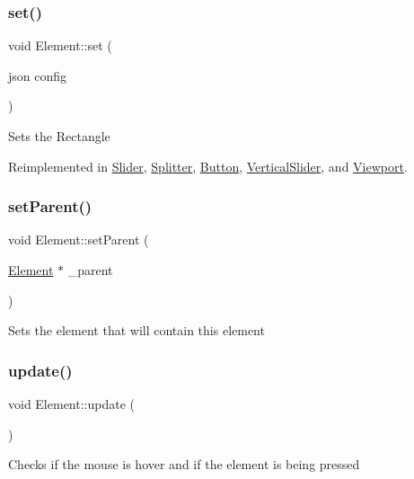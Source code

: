 \subsubsection{\texorpdfstring{set()}{set()}}
{\footnotesize\ttfamily void Element\+::set (\begin{DoxyParamCaption}\item[{json}]{config }\end{DoxyParamCaption})\hspace{0.3cm}{\ttfamily [virtual]}}

Sets the Rectangle 

Reimplemented in \hyperlink{class_slider_a834dbe16812e7bd4f0472882b0619ea9}{Slider}, \hyperlink{class_splitter_a38aab36f28b7f5b834fefae247f5c37e}{Splitter}, \hyperlink{class_button_a6e7c3b800fae0b1e7765ccdafc88c28e}{Button}, \hyperlink{class_vertical_slider_a35b7771bd63647aa288f16719611b567}{Vertical\+Slider}, and \hyperlink{class_viewport_a96703fae50a7a103da0a576c55fbdea5}{Viewport}.

\mbox{\label{class_element_a613fd8cd5c12461d534170a63cb69395}} 
\subsubsection{\texorpdfstring{set\+Parent()}{setParent()}}
{\footnotesize\ttfamily void Element\+::set\+Parent (\begin{DoxyParamCaption}\item[{\hyperlink{class_element}{Element} $\ast$}]{\+\_\+parent }\end{DoxyParamCaption})}

Sets the element that will contain this element \mbox{\label{class_element_a35de04f6ab79440bb44083d8b300b87d}} 
\subsubsection{\texorpdfstring{update()}{update()}}
{\footnotesize\ttfamily void Element\+::update (\begin{DoxyParamCaption}{ }\end{DoxyParamCaption})\hspace{0.3cm}{\ttfamily [virtual]}}

Checks if the mouse is hover and if the element is being pressed 

